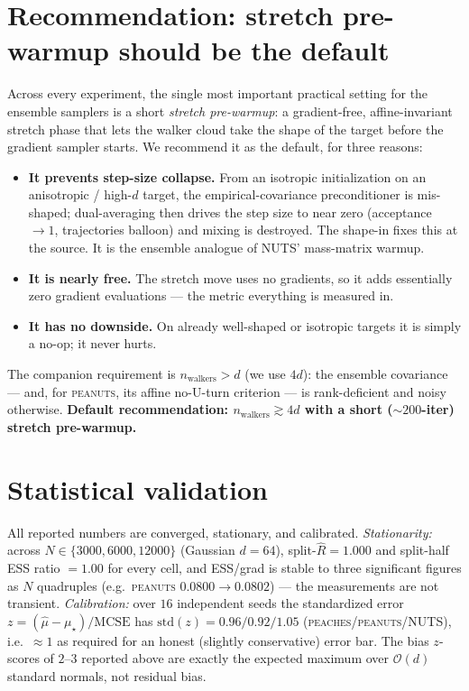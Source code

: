 \documentclass[11pt]{article}
\begin{document}
\section{Recommendation: stretch pre-warmup should be the default}
\label{sec:ws}

Across every experiment, the single most important practical setting for the
ensemble samplers is a short \emph{stretch pre-warmup}: a gradient-free,
affine-invariant stretch phase that lets the walker cloud take the shape of
the target before the gradient sampler starts. We recommend it as the
default, for three reasons:
\begin{itemize}\setlength\itemsep{2pt}
\item \textbf{It prevents step-size collapse.} From an isotropic
initialization on an anisotropic / high-$d$ target, the empirical-covariance
preconditioner is mis-shaped; dual-averaging then drives the step size to
near zero (acceptance $\to1$, trajectories balloon) and mixing is destroyed.
The shape-in fixes this at the source. It is the ensemble analogue of
NUTS' mass-matrix warmup.
\item \textbf{It is nearly free.} The stretch move uses no gradients, so it
adds essentially zero gradient evaluations --- the metric everything is
measured in.
\item \textbf{It has no downside.} On already well-shaped or isotropic
targets it is simply a no-op; it never hurts.
\end{itemize}
The companion requirement is $n_{\text{walkers}}\!>\!d$ (we use $4d$): the
ensemble covariance --- and, for \textsc{peanuts}, its affine no-U-turn
criterion --- is rank-deficient and noisy otherwise. \textbf{Default
recommendation: $n_{\text{walkers}}\!\gtrsim\!4d$ with a short
($\sim\!200$-iter) stretch pre-warmup.}

\section{Statistical validation}\label{sec:valid}

All reported numbers are converged, stationary, and calibrated.
\emph{Stationarity:} across $N\!\in\!\{3000,6000,12000\}$ (Gaussian $d{=}64$),
split-$\hat R=1.000$ and split-half ESS ratio $=1.00$ for every cell, and
ESS/grad is stable to three significant figures as $N$ quadruples (e.g.\
\textsc{peanuts} $0.0800\!\to\!0.0802$) --- the measurements are not
transient. \emph{Calibration:} over $16$ independent seeds the standardized
error $z=(\hat\mu-\mu_\star)/\text{MCSE}$ has $\mathrm{std}(z)=0.96/0.92/1.05$
(\textsc{peaches}/\textsc{peanuts}/NUTS), i.e.\ $\approx\!1$ as required for
an honest (slightly conservative) error bar. The bias $z$-scores of $2$--$3$
reported above are exactly the expected maximum over $\mathcal O(d)$ standard
normals, not residual bias.
\end{document}
